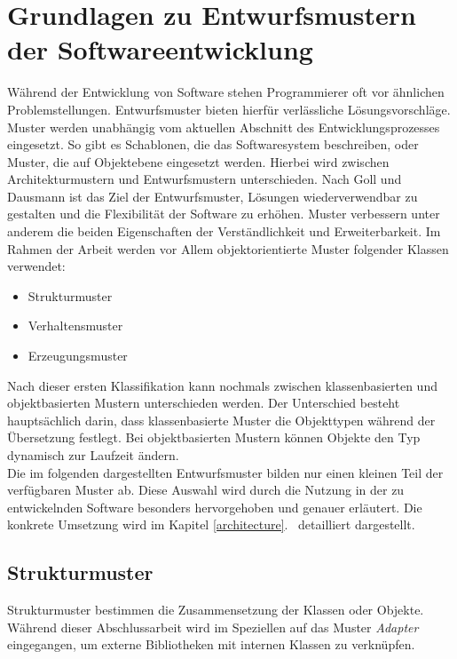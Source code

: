 \chapter{Grundlagen zu Entwurfsmustern der Softwareentwicklung}

Während der Entwicklung von Software stehen Programmierer oft vor ähnlichen Problemstellungen. Entwurfsmuster bieten hierfür verlässliche Lösungsvorschläge\cite{goll:swa}. Muster werden unabhängig vom aktuellen Abschnitt des Entwicklungsprozesses eingesetzt. So gibt es Schablonen, die das Softwaresystem beschreiben, oder Muster, die auf Objektebene eingesetzt werden. Hierbei wird zwischen Architekturmustern und Entwurfsmustern unterschieden. Nach Goll und Dausmann \cite[3.1, 3.2]{goll:swa} ist das Ziel der Entwurfsmuster, Lösungen wiederverwendbar zu gestalten und die Flexibilität der Software zu erhöhen. Muster verbessern unter anderem die beiden Eigenschaften der Verständlichkeit und Erweiterbarkeit. Im Rahmen der Arbeit werden vor Allem objektorientierte Muster folgender Klassen verwendet:

\begin{itemize}
\item Strukturmuster
\item Verhaltensmuster
\item Erzeugungsmuster
\end{itemize}

Nach dieser ersten Klassifikation kann nochmals zwischen klassenbasierten und objektbasierten Mustern unterschieden werden. Der Unterschied besteht hauptsächlich darin, dass klassenbasierte Muster die Objekttypen während der Übersetzung festlegt. Bei objektbasierten Mustern können Objekte den  Typ dynamisch zur Laufzeit ändern\cite[4.1]{goll:swa}.\\
Die im folgenden dargestellten Entwurfsmuster bilden nur einen kleinen Teil der verfügbaren Muster ab. Diese Auswahl wird durch die Nutzung in der zu entwickelnden Software besonders hervorgehoben und genauer erläutert. Die konkrete Umsetzung wird im Kapitel \glqq \ref{architecture}.  \grqq\ detailliert dargestellt.

\section{Strukturmuster}
Strukturmuster bestimmen die Zusammensetzung der Klassen oder Objekte. Während dieser Abschlussarbeit wird im Speziellen auf das Muster \textit{Adapter} eingegangen, um externe Bibliotheken mit internen Klassen zu verknüpfen.

